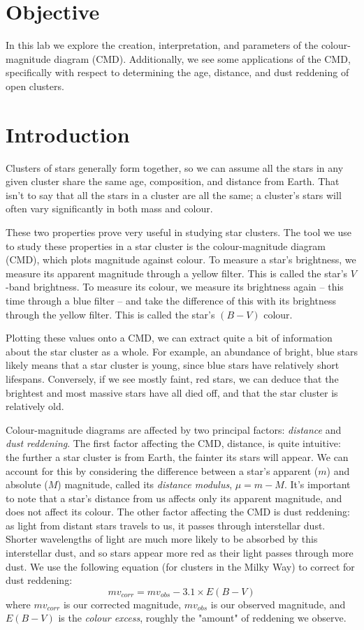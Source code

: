 \documentclass[11pt]{article}
\begin{document}
\section{Objective}
In this lab we explore the creation, interpretation, and parameters of the colour-magnitude diagram (CMD).
Additionally, we see some applications of the CMD, specifically with respect to determining the age, distance, and dust reddening of open clusters.


\section{Introduction}
Clusters of stars generally form together, so we can assume all the stars in any given cluster share the same age, composition, and distance from Earth.
That isn't to say that all the stars in a cluster are all the same; a cluster's stars will often vary significantly in both mass and colour.

These two properties prove very useful in studying star clusters.
The tool we use to study these properties in a star cluster is the colour-magnitude diagram (CMD), which plots magnitude against colour.
To measure a star's brightness, we measure its apparent magnitude through a yellow filter.
This is called the star's $V$-band brightness.
To measure its colour, we measure its brightness again -- this time through a blue filter -- and take the difference of this with its brightness through the yellow filter.
This is called the star's $(B - V)$ colour.

Plotting these values onto a CMD, we can extract quite a bit of information about the star cluster as a whole.
For example, an abundance of bright, blue stars likely means that a star cluster is young, since blue stars have relatively short lifespans.
Conversely, if we see mostly faint, red stars, we can deduce that the brightest and most massive stars have all died off, and that the star cluster is relatively old.

Colour-magnitude diagrams are affected by two principal factors: \emph{distance} and \emph{dust reddening}.
The first factor affecting the CMD, distance, is quite intuitive: the further a star cluster is from Earth, the fainter its stars will appear.
We can account for this by considering the difference between a star's apparent ($m$) and absolute ($M$) magnitude, called its \emph{distance modulus}, $\mu = m - M$.
It's important to note that a star's distance from us affects only its apparent magnitude, and does not affect its colour.
The other factor affecting the CMD is dust reddening: as light from distant stars travels to us, it passes through interstellar dust.
Shorter wavelengths of light are much more likely to be absorbed by this interstellar dust, and so stars appear more red as their light passes through more dust.
We use the following equation (for clusters in the Milky Way) to correct for dust reddening:
\[mv_{corr} = mv_{obs} - 3.1 \times E(B - V)\]
where $mv_{corr}$ is our corrected magnitude, $mv_{obs}$ is our observed magnitude, and $E(B - V)$ is the \emph{colour excess}, roughly the "amount" of reddening we observe.
\end{document}
